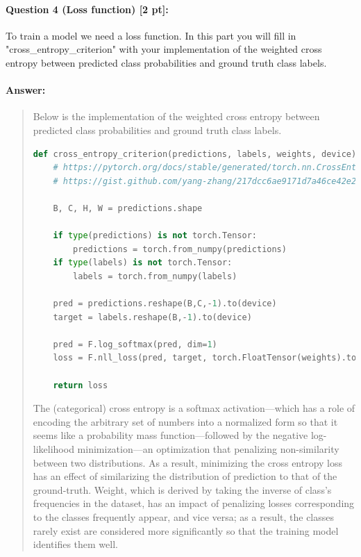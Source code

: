 \documentclass[11pt]{article}
\begin{document}
\paragraph{Question 4 (Loss function) [2 pt]:} 
To train a model we need a loss function. In this part you will fill in "cross\_entropy\_criterion" with your implementation of the weighted cross entropy between predicted class probabilities and ground truth class labels.
\paragraph{Answer:} 
\begin{quote}

Below is the implementation of the weighted cross entropy between predicted class probabilities and ground truth class labels.

\begin{lstlisting}[language=Python, basicstyle=\scriptsize]
def cross_entropy_criterion(predictions, labels, weights, device):
    # https://pytorch.org/docs/stable/generated/torch.nn.CrossEntropyLoss.html#torch.nn.CrossEntropyLoss
    # https://gist.github.com/yang-zhang/217dcc6ae9171d7a46ce42e215c1fee0
    
    B, C, H, W = predictions.shape

    if type(predictions) is not torch.Tensor:
        predictions = torch.from_numpy(predictions)
    if type(labels) is not torch.Tensor:
        labels = torch.from_numpy(labels)

    pred = predictions.reshape(B,C,-1).to(device)
    target = labels.reshape(B,-1).to(device)

    pred = F.log_softmax(pred, dim=1)
    loss = F.nll_loss(pred, target, torch.FloatTensor(weights).to(device))

    return loss
\end{lstlisting}

The (categorical) cross entropy is a softmax activation---which has a role of encoding the arbitrary set of numbers into a normalized form so that it seems like a probability mass function---followed by the negative log-likelihood minimization---an optimization that penalizing non-similarity between two distributions. As a result, minimizing the cross entropy loss has an effect of similarizing the distribution of prediction to that of the ground-truth. Weight, which is derived by taking the inverse of class's frequencies in the dataset, has an impact of penalizing losses corresponding to the classes frequently appear, and vice versa; as a result, the classes rarely exist are considered more significantly so that the training model identifies them well.

\end{quote}
\end{document}
